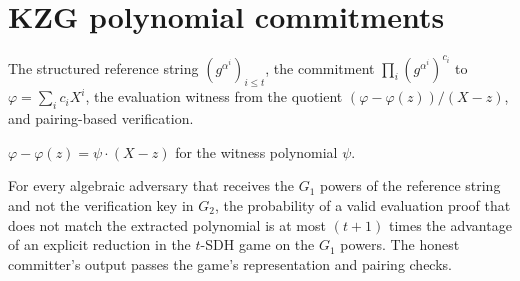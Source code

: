 \section{KZG polynomial commitments}

\begin{definition}[KZG]
  \label{def:kzg}
  \leanok
  The structured reference string $(g^{\alpha^i})_{i \le t}$, the commitment
  $\prod_i (g^{\alpha^i})^{c_i}$ to $\varphi = \sum_i c_i X^i$, the evaluation
  witness from the quotient $(\varphi - \varphi(z))/(X - z)$, and pairing-based
  verification.
\end{definition}

\begin{lemma}
  \label{lem:kzg-witness}
  \leanok
  $\varphi - \varphi(z) = \psi \cdot (X - z)$ for the witness polynomial $\psi$.
\end{lemma}

\begin{theorem}
  \label{thm:kzg-ks}
  \leanok
  For every algebraic adversary that receives the $G_1$ powers of the reference
  string and not the verification key in $G_2$, the probability of a valid
  evaluation proof that does not match the extracted polynomial is at most
  $(t + 1)$ times the advantage of an explicit reduction in the $t$-SDH game on
  the $G_1$ powers. The honest committer's output passes the game's representation
  and pairing checks.
\end{theorem}
